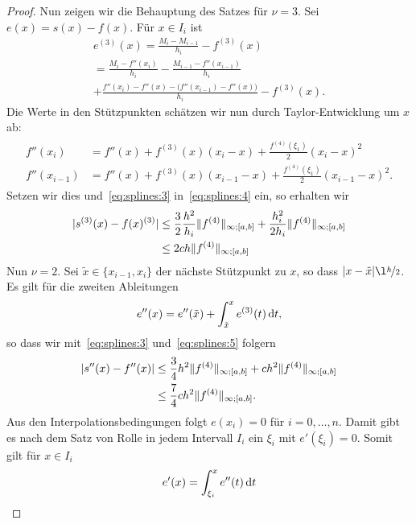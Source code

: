 \begin{proof}
  Nun zeigen wir die Behauptung des Satzes für $\nu=3$. Sei
  $e(x) = s(x) - f(x)$. Für $x\in I_i$ ist
  \begin{multline}
    \label{eq:splines:4}
    e^{(3)}(x)
    = \frac{M_i-M_{i-1}}{h_i} - f^{(3)}(x) \\
    = \frac{M_i-f''(x_i)}{h_i} - \frac{M_{i-1}-f''(x_{i-1})}{h_i}
    \\
    + \frac{f''(x_i) - f''(x) -\bigl(f''(x_{i-1}) - f''(x)\bigr)}{h_i}
    - f^{(3)}(x).
  \end{multline}
  Die Werte in den Stützpunkten schätzen wir nun durch
  Taylor-Entwicklung um $x$ ab:
  \begin{gather}
    \begin{split}
    f''(x_i) &= f''(x) + f^{(3)}(x)(x_i-x)
    + \frac{f^{(4)}(\xi_1)}{2} (x_i-x)^2
    \\
    f''(x_{i-1}) &= f''(x) + f^{(3)}(x)(x_{i-1}-x)
    + \frac{f^{(4)}(\xi_1)}{2} (x_{i-1}-x)^2.
    \end{split}
  \end{gather}
  Setzen wir dies und~\eqref{eq:splines:3} in~\eqref{eq:splines:4}
  ein, so erhalten wir
  \begin{align}
    \notag
    \lvert s^{(3)}(x) - f(x)^{(3)}\rvert
    &\le \frac32 \frac{h^2}{h_i} \lVert f^{(4)}\rVert_{\infty;[a,b]}
      + \frac{h_i^2}{2h_i} \lVert f^{(4)}\rVert_{\infty;[a,b]}
    \\
    \label{eq:splines:5}
    &\le 2 c h \lVert f^{(4)}\rVert_{\infty;[a,b]}
  \end{align}
  Nun $\nu=2$. Sei $\tilde x\in\{x_{i-1},x_i\}$ der nächste Stützpunkt zu $x$, so dass $\abs{x-\tilde x} \l \nicefrac h2$. Es gilt für die zweiten Ableitungen
  \begin{gather}
    e''(x) = e''(\tilde x) + \int_{\tilde x}^x e^{(3)}(t)\,\mathrm{d} t,
  \end{gather}
  so dass wir mit~\eqref{eq:splines:3} und~\eqref{eq:splines:5} folgern
  \begin{align}
    \notag
    \lvert s''(x) - f''(x)\rvert &\le \frac34 h^2 \lVert f^{(4)}\rVert_{\infty;[a,b]}
    + ch^2 \lVert f^{(4)}\rVert_{\infty;[a,b]}\\
    \label{eq:splines:6}
    &\le \frac74 ch^2 \lVert f^{(4)}\rVert_{\infty;[a,b]}
    .
  \end{align}
  Aus den Interpolationsbedingungen folgt $e(x_i) = 0$ für
  $i=0,\dots,n$.  Damit gibt es nach dem Satz von Rolle in jedem
  Intervall $I_i$ ein $\xi_i$ mit $e'(\xi_i) = 0$. Somit gilt für $x\in I_i$
  \begin{gather}
    e'(x) = \int_{\xi_i}^x e''(t)\dt

\end{gather}
\end{proof}
